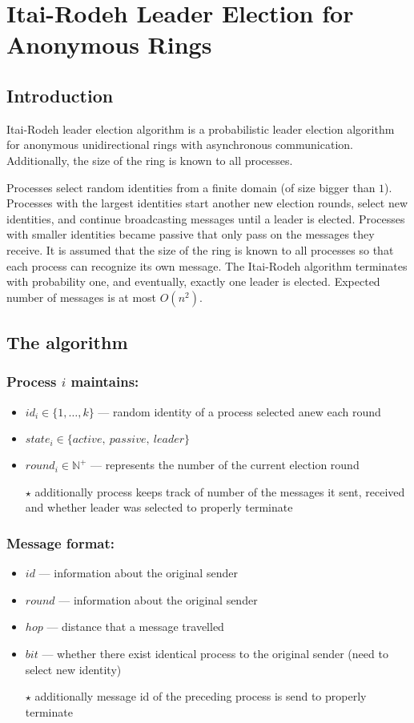 \documentclass{article}
\begin{document}
\section*{Itai-Rodeh Leader Election for Anonymous Rings}

\subsection*{Introduction}
Itai-Rodeh leader election algorithm is a probabilistic leader election algorithm for anonymous unidirectional rings with asynchronous communication. Additionally, the size of the ring is known to all processes.

Processes select random identities from a finite domain (of size bigger than $1$). Processes with the largest identities start another new election rounds, select new identities, and continue broadcasting messages until a leader is elected. Processes with smaller identities became passive that only pass on the messages they receive. It is assumed that the size of the ring is known to all processes so that each process can recognize its own message. The Itai-Rodeh algorithm terminates with probability one, and eventually, exactly one leader is elected. Expected number of messages is at most $O(n^2)$.

\subsection*{The algorithm}
\subsubsection*{Process $i$ maintains:}
\begin{itemize}
    \item $id_i \in \{1, \ldots , k\}$ --- random identity of a process selected anew each round
    \item $state_i \in \{active,\ passive,\ leader\}$
    \item $round_i \in \mathbb{N}^+$ --- represents the number of the current election round
    \item[$\star$] additionally process keeps track of number of the messages it sent, received and whether leader was selected to properly terminate
\end{itemize}

\subsubsection*{Message format:}
\begin{itemize}
    \item $id$ --- information about the original sender
    \item $round$ --- information about the original sender
    \item $hop$ --- distance that a message travelled
    \item $bit$ --- whether there exist identical process to the original sender (need to select new identity)
    \item[$\star$] additionally message id of the preceding process is send to properly terminate
\end{itemize}
\end{document}
